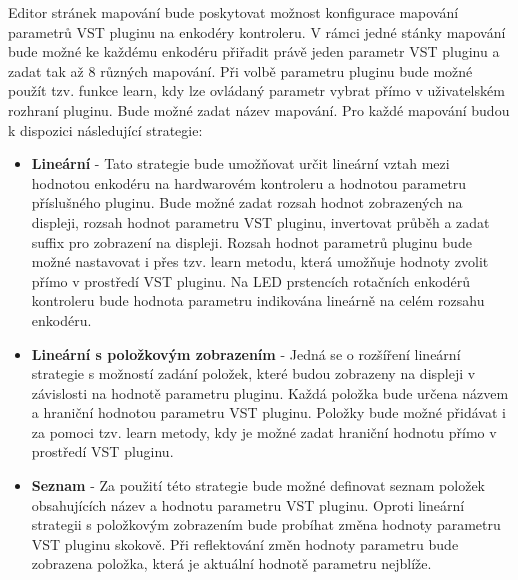 \documentclass[thesis=M,czech]{FITthesis}[2019/03/06]
\begin{document}
		Editor stránek mapování bude poskytovat možnost konfigurace mapování parametrů VST pluginu na enkodéry kontroleru.
		V rámci jedné stánky mapování bude možné ke každému enkodéru přiřadit právě jeden parametr VST pluginu a zadat tak až 8 různých mapování.
		Při volbě parametru pluginu bude možné použít tzv. funkce learn, kdy lze ovládaný parametr vybrat přímo v uživatelském rozhraní pluginu.
		Bude možné zadat název mapování.
		Pro každé mapování budou k dispozici následující strategie:
		\begin{itemize}
			\item\label{LinearMappingStrategy} \textbf{Lineární} - Tato strategie bude umožňovat určit lineární vztah mezi hodnotou enkodéru na hardwarovém kontroleru 
			a hodnotou parametru příslušného pluginu. Bude možné zadat rozsah hodnot zobrazených na displeji, rozsah hodnot parametru VST pluginu, invertovat
			průběh a zadat suffix pro zobrazení na displeji. Rozsah hodnot parametrů pluginu bude možné nastavovat i přes tzv. learn metodu, která 
			umožňuje hodnoty zvolit přímo v prostředí VST pluginu. Na LED prstencích rotačních enkodérů kontroleru bude hodnota parametru indikována lineárně na celém rozsahu enkodéru.
			
			\item \textbf{Lineární s položkovým zobrazením} - Jedná se o rozšíření lineární strategie s možností zadání položek, které
			budou zobrazeny na displeji v závislosti na hodnotě parametru pluginu. Každá položka bude určena názvem a hraniční hodnotou parametru VST pluginu.
			Položky bude možné přidávat i za pomoci tzv. learn metody, kdy je možné zadat hraniční hodnotu přímo v prostředí VST pluginu.

			\item \textbf{Seznam} - Za použití této strategie bude možné definovat seznam položek obsahujících název a hodnotu parametru VST pluginu.
			Oproti lineární strategii s položkovým zobrazením bude probíhat změna hodnoty parametru VST pluginu skokově. Při reflektování změn hodnoty parametru bude zobrazena
			položka, která je aktuální hodnotě parametru nejblíže.
		\end{itemize}
		
\end{document}
